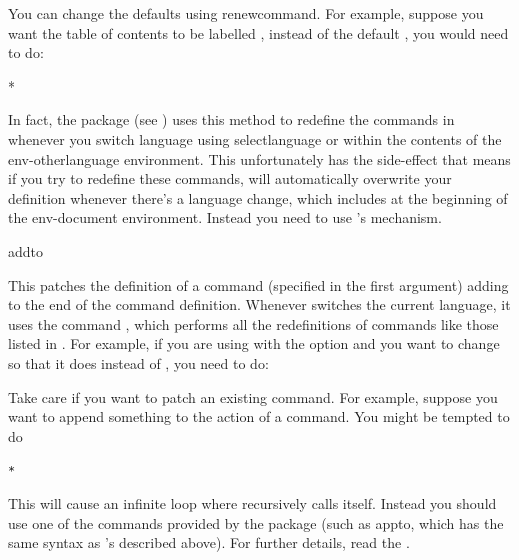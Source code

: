 You can change the defaults using \gls{renewcommand}.  For
example, suppose you want the table of contents to be labelled
, instead of the default , you
would need to do:
\begin{codeS}
*
\end{codeS}
In fact, the
 package (see ) uses this method
to redefine the commands in  whenever you
switch language using \reportlinebreak\screenlinebreak
\gls{selectlanguage} or within the contents of
the \gls{env-otherlanguage} environment. This unfortunately has the
side-effect that means if you try to redefine these commands,
 will automatically overwrite your definition whenever
there's a language change, which includes at the beginning of the
\gls{env-document} environment. Instead you need to use
's  mechanism.
\begin{definition}
\gls{addto}
\end{definition}
This patches the definition of a command (specified in the first
\gls{argument}) adding  to the end of the command
definition. Whenever  switches the current language, it
uses the command , which performs
all the redefinitions of commands like those listed in
. For example, if you are using 
with the  option and you want to change
 so that it does  instead
of , you need to do:
\begin{code}
\begin{alltt}
\end{alltt}
\end{code}


\warning Take care if you want to patch an existing command. For
example, suppose you want to append something to the action of a
command. You might be tempted to do
\begin{alltt}
\wrong{}*
\end{alltt}
This will cause an infinite loop where  recursively
calls itself. Instead you should use one of the commands provided by
the  package (such as \gls{appto}, which has the same
syntax as 's  described above). For further details,
read the  .

